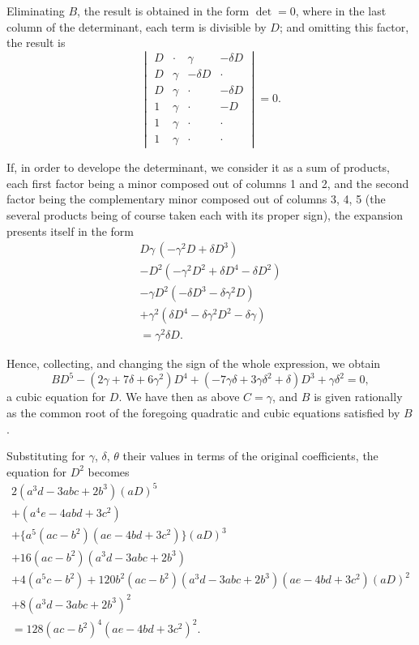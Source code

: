 \documentclass[11pt,a4paper]{book}
\begin{document}
Eliminating $B$, the result is obtained in the form $\det = 0$, where in the last column of the determinant, each term is divisible by $D$; and omitting this factor, the result is
\[
\begin{vmatrix}
D & \cdot & \gamma & -\delta D \\
D & \gamma & -\delta D & \cdot \\
D & \gamma & \cdot & -\delta D \\
1 & \gamma & \cdot & -D \\
1 & \gamma & \cdot & \cdot \\
1 & \gamma & \cdot & \cdot
\end{vmatrix} = 0.
\]

If, in order to develope the determinant, we consider it as a sum of products, each first factor being a minor composed out of columns 1 and 2, and the second factor being the complementary minor composed out of columns 3, 4, 5 (the several products being of course taken each with its proper sign), the expansion presents itself in the form
\begin{multline*}
D\gamma\,(-\gamma^{2}D + \delta D^{3}) \\
- D^{2}(-\gamma^{2}D^{2} + \delta D^{4} - \delta D^{2}) \\
- \gamma D^{2}(-\delta D^{3} - \delta\gamma^{2}D) \\
+ \gamma^{2}(\delta D^{4} - \delta\gamma^{2}D^{2} - \delta\gamma) \\
= \gamma^{2}\delta D.
\end{multline*}

Hence, collecting, and changing the sign of the whole expression, we obtain
\[
BD^{5} - (2\gamma + 7\delta + 6\gamma^{2})D^{4} + (-7\gamma\delta + 3\gamma\delta^{2} + \delta)D^{3} + \gamma\delta^{2} = 0,
\]
a cubic equation for $D$. We have then as above $C = \gamma$, and $B$ is given rationally as the common root of the foregoing quadratic and cubic equations satisfied by $B$.

Substituting for $\gamma$, $\delta$, $\theta$ their values in terms of the original coefficients, the equation for $D^{2}$ becomes
\begin{multline*}
2(a^{3}d - 3abc + 2b^{3})(aD)^{5} \\
+ (a^{4}e - 4abd + 3c^{2}) \\
+ \{a^{5}(ac - b^{2})(ae - 4bd + 3c^{2})\}(aD)^{3} \\
+ 16(ac - b^{2})(a^{3}d - 3abc + 2b^{3}) \\
+ 4(a^{5}c - b^{2}) + 120b^{2}(ac - b^{2})(a^{3}d - 3abc + 2b^{3})(ae - 4bd + 3c^{2})(aD)^{2} \\
+ 8(a^{3}d - 3abc + 2b^{3})^{2} \\
= 128(ac - b^{2})^{4}(ae - 4bd + 3c^{2})^{2}.
\end{multline*}
\end{document}
